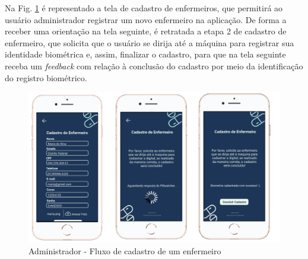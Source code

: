 Na Fig. \ref{fig:prototipo_admin_cadastroEnfermeiro_Parte1} é representado a tela de cadastro de enfermeiros, que permitirá ao usuário administrador registrar um novo enfermeiro na aplicação. De forma a receber uma orientação na tela seguinte, é retratada a etapa 2 de cadastro de enfermeiro, que solicita que o usuário se dirija até a máquina para registrar sua identidade biométrica e, assim, finalizar o cadastro, para que na tela seguinte receba um \textit{feedback} com relação à conclusão do cadastro por meio da identificação do registro biométrico.
\begin{figure}[H]
    \centering
    \includegraphics[width=15cm]{figuras/software/Atual_prototipo/Admin_CadastroEnfermeiro.png}
    \caption{Administrador - Fluxo de cadastro de um enfermeiro}
    \label{fig:prototipo_admin_cadastroEnfermeiro_Parte1}
\end{figure}

